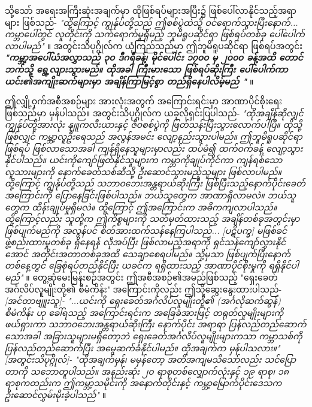 \documentclass[10pt,twocolumn,letterpaper]{article}
\begin{document}
သို့သော် အရေးအကြီးဆုံးအချက်မှာ ထိုဖြစ်ရပ်များအပြီး၌ ဖြစ်ပေါ်လာနိုင်သည့်အရာများ ဖြစ်သည်- \textit{"ထို့ကြောင့် ကျွန်ုပ်တို့သည် ဤစစ်ပွဲထဲသို့ ဝင်ရောက်သွားပြီးနောက်... ကမ္ဘာပေါ်တွင် လူတိုင်းကို သက်ရောက်မှုရှိမည့် ဘူမိရူပဆိုင်ရာ ဖြစ်ရပ်တစ်ခု ပေါ်ပေါက်လာပါမည်"} \cite{4}။ အတွင်းသိပုဂ္ဂိုလ်က ယုံကြည်သည်မှာ ဤဘူမိရူပဆိုင်ရာ ဖြစ်ရပ်အတွင်း \textit{\textbf{"ကမ္ဘာ့အပေါ်ယံအလွှာသည် ၃၀ ဒီဂရီခန့်၊ မိုင်ပေါင်း ၁၇၀၀ မှ ၂၀၀၀ ခန့်အထိ တောင်ဘက်သို့ ရွေ့လျားသွားမည်။ ထိုအခါ ကြီးမားသော ဖြစ်ရပ်ဆိုးကြီး ပေါ်ပေါက်ကာ ယင်း၏အကျိုးဆက်များမှာ အချိန်ကြာမြင့်စွာ တည်ရှိနေပါလိမ့်မည် "}} \cite{4}။

ဤလျှို့ဝှက်အစီအစဉ်များ အားလုံးအတွက် အကြောင်းရင်းမှာ အာဏာပိုင်စိုးရေးဖြစ်သည်မှာ မှန်ပါသည်။ အတွင်းသိပုဂ္ဂိုလ်က ယခုလိုရှင်းပြပါသည်- \textit{"ထိုအချိန်ဆိုလျှင် ကျွန်ုပ်တို့အားလုံး နျူကလီးယားနှင့် ဇီဝစစ်ပွဲကို ဖြတ်သန်းပြီးသွားလောက်ပါပြီ။ ထိုသို့ဖြစ်လျှင် ကမ္ဘာ့လူဦးရေသည် အလွန်အမင်း လျော့နည်းသွားပါမည်။ ဤဘူမိရူပဆိုင်ရာ ဖြစ်ရပ် ဖြစ်လာသောအခါ ကျန်ရှိနေသူများမှာလည်း ထပ်မံ၍ ထက်ဝက်ခန့် လျော့သွားနိုင်ပါသည်။ ယင်းကိုကျော်ဖြတ်နိုင်သူများက ကမ္ဘာကိုချုပ်ကိုင်ကာ ကျန်ရစ်သော လူသားများကို နောက်ခေတ်သစ်ဆီသို့ ဦးဆောင်သွားမည့်သူများ ဖြစ်လာပါမည်။ ထို့ကြောင့် ကျွန်ုပ်တို့သည် သဘာဝဘေးအန္တရာယ်ဆိုးကြီး ဖြစ်ပြီးသည့်နောက်ပိုင်းခေတ်အကြောင်းကို ပြောနေခြင်းဖြစ်ပါသည်။ ဘယ်သူတွေက အာဏာရှိလာမလဲ။ ဘယ်သူတွေက ထိန်းချုပ်မှုရှိမလဲ။ ထို့ကြောင့် ဤအကြောင်းက အဓိကကျလာပါသည်။ ထို့ကြောင့်လည်း သူတို့က ဤကိစ္စများကို သတ်မှတ်ထားသည့် အချိန်တစ်ခုအတွင်းမှာ ဖြစ်ပျက်မည်ကို အလွန်ပင် စိတ်အားထက်သန်နေကြပါသည်... [ပဋိပက္ခ] မဖြစ်ခင် ဖွဲ့စည်းထားမှုတစ်ခု ရှိနေရန် လိုအပ်ပြီး ဖြစ်လာမည့်အရာကို ရှင်သန်ကျော်လွှားနိုင်အောင် အတိုင်းအတာတစ်ခုအထိ သေချာစေရပါမည်။ သို့မှသာ ဖြစ်ပျက်ပြီးနောက်တစ်နေ့တွင် ခြေစုံရပ်တည်နိုင်ပြီး ယခင်က ရရှိထားသည့် အာဏာပိုင်စိုးမှုကို ရရှိနိုင်ပါမည်"} \cite{4}။ တွေ့ဆုံမေးမြန်းစဉ်အတွင်း ဤအစီအစဉ်၏အမည်ဖြစ်သည့် "ရှေးခေတ်အင်္ဂလိပ်လူမျိုးတို့၏ စီမံကိန်း" အကြောင်းကိုလည်း ဤသို့ဆွေးနွေးထားပါသည်- \textit{[အင်တာဗျူးသူ]- "...ယင်းကို ရှေးခေတ်အင်္ဂလိပ်လူမျိုးတို့၏ (အင်္ဂလိုဆက်ဆွန်) စီမံကိန်း ဟု ခေါ်ရသည့် အကြောင်းရင်းက အခြေခံအားဖြင့် တရုတ်လူမျိုးများကို ဖယ်ရှားကာ သဘာဝဘေးအန္တရာယ်ဆိုးကြီး နောက်ပိုင်း အရာရာ ပြန်လည်တည်ဆောက်သောအခါ အခြားသူများမရှိတော့ဘဲ ရှေးခေတ်အင်္ဂလိပ်လူမျိုးများကသာ ကမ္ဘာသစ်ကို ပြန်လည်တည်ဆောက်ပြီး အမွေဆက်ခံနိုင်ပါမည်။ ထိုအချက်က မှန်ပါသလား။" [အတွင်းသိပုဂ္ဂိုလ်]- "ထိုအချက်မှန်၊ မမှန်တော့ အတိအကျမသိသော်လည်း သင်ပြောတာကို သဘောတူပါသည်။ အနည်းဆုံး ၂၀ ရာစုတစ်လျှောက်လုံးနှင့် ၁၉ ရာစု၊ ၁၈ ရာစုကတည်းက ဤကမ္ဘာ့သမိုင်းကို အနောက်တိုင်းနှင့် ကမ္ဘာ့မြောက်ပိုင်းဒေသက ဦးဆောင်လွှမ်းမိုးခဲ့ပါသည်"} \cite{4}။
\end{document}
